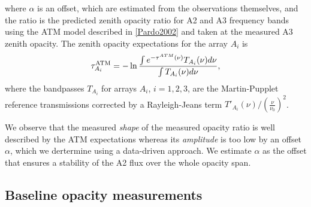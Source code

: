  where $\alpha$ is an offset, which are estimated from the observations themselves, and the ratio is the predicted zenith opacity ratio for A2 and A3 frequency bands using the ATM model described in \ref{Pardo2002} and taken at the measured A3 zenith opacity. The zenith opacity expectations for the array $A_i$ is
\begin{equation}
  \tau^{\rm{ATM}}_{A_i} = - \ln{\frac{\int e^{-\tau^{ATM}(\nu)} T_{A_i}(\nu) d\nu}{ \int T_{A_i}(\nu) d\nu}},
\end{equation}
where the bandpasses $T_{A_i}$ for arrays $A_i$, $i=1, 2, 3$, are the Martin-Pupplet reference transmissions
corrected by a Rayleigh-Jeans term  $T'_{A_i}(\nu) / \left( \frac{\nu}{\nu_0}\right)^2$. 

We observe that the measured \emph{shape} of the measured opacity ratio is well described by the ATM expectations whereas its \emph{amplitude} is too low by an offset $\alpha$, which we dertermine using a data-driven approach. We estimate $\alpha$ as the offset that ensures a stability of the A2 flux over the whole opacity span.  






\subsection{Baseline opacity measurements}




